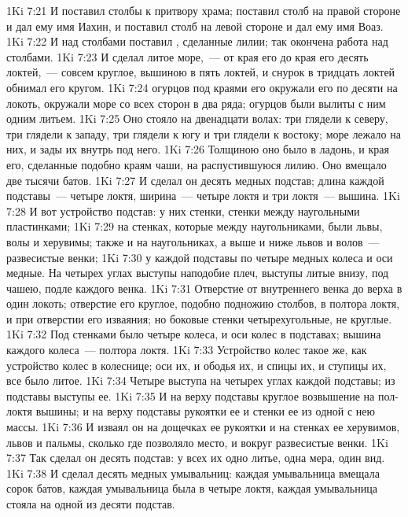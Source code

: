 \vs 1Ki 7:21 И поставил столбы к притвору храма; поставил столб на правой стороне и дал ему имя Иахин, и поставил столб на левой стороне и дал ему имя Воаз.
\vs 1Ki 7:22 И над столбами поставил , сделанные  лилии; так окончена работа над столбами.
\vs 1Ki 7:23 И сделал литое  море,~--- от края его до края его десять локтей,~--- совсем круглое, вышиною в пять локтей, и снурок в тридцать локтей обнимал его кругом.
\vs 1Ki 7:24  огурцов под краями его окружали его по десяти на локоть, окружали море со всех сторон в два ряда;  огурцов были вылиты с ним одним литьем.
\vs 1Ki 7:25 Оно стояло на двенадцати волах: три глядели к северу, три глядели к западу, три глядели к югу и три глядели к востоку; море лежало на них, и зады их  внутрь под него.
\vs 1Ki 7:26 Толщиною оно было в ладонь, и края его, сделанные подобно краям чаши,  на распустившуюся лилию. Оно вмещало две тысячи батов.
\vs 1Ki 7:27 И сделал он десять медных подстав; длина каждой подставы~--- четыре локтя, ширина~--- четыре локтя и три локтя~--- вышина.
\vs 1Ki 7:28 И вот устройство подстав: у них стенки, стенки между наугольными пластинками;
\vs 1Ki 7:29 на стенках, которые между наугольниками,  были львы, волы и херувимы; также и на наугольниках, а выше и ниже львов и волов~--- развесистые венки;
\vs 1Ki 7:30 у каждой подставы по четыре медных колеса и оси медные. На четырех углах выступы наподобие плеч, выступы литые внизу, под чашею, подле каждого венка.
\vs 1Ki 7:31 Отверстие от внутреннего венка до верха в один локоть; отверстие его круглое, подобно подножию столбов, в полтора локтя, и при отверстии его изваяния; но боковые стенки четырехугольные, не круглые.
\vs 1Ki 7:32 Под стенками было четыре колеса, и оси колес в подставах; вышина каждого колеса~--- полтора локтя.
\vs 1Ki 7:33 Устройство колес такое же, как устройство колес в колеснице; оси их, и ободья их, и спицы их, и ступицы их, все было литое.
\vs 1Ki 7:34 Четыре выступа на четырех углах каждой подставы; из подставы  выступы ее.
\vs 1Ki 7:35 И на верху подставы круглое возвышение на пол-локтя вышины; и на верху подставы рукоятки ее и стенки ее из одной с нею массы.
\vs 1Ki 7:36 И изваял он на дощечках ее рукоятки и на стенках ее херувимов, львов и пальмы, сколько где позволяло место, и вокруг развесистые венки.
\vs 1Ki 7:37 Так сделал он десять подстав: у всех их одно литье, одна мера, один вид.
\vs 1Ki 7:38 И сделал десять медных умывальниц: каждая умывальница вмещала сорок батов, каждая умывальница была в четыре локтя, каждая умывальница стояла на одной из десяти подстав.
